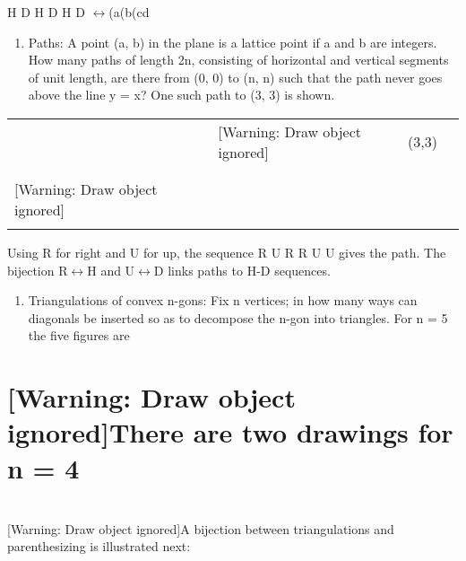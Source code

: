 \documentclass{article}
\begin{document}
H D H D H D $\leftrightarrow $(a(b(cd

\begin{enumerate}
\item [Warning: Draw object ignored]Paths:  A point (a, b) in the plane is a lattice point if a and b are integers. How
many paths of length 2n, consisting of horizontal and vertical segments of unit length, are there from (0, 0) to (n, n)
such that the path never goes above the line y = x? One such path to (3, 3) is shown.
\end{enumerate}
\begin{flushleft}
\tablefirsthead{}
\tablehead{}
\tabletail{}
\tablelasttail{}
\begin{supertabular}{|m{0.37055984in}|m{0.35875985in}|m{0.35875985in}|m{0.35875985in}m{0.35875985in}}
 &
 &
[Warning: Draw object ignored] &
(3,3) &
\\\hhline{----~}
 &
 &
 &
 &
\\\hhline{----~}
 &
 &
 &
 &
\\\hhline{----~}
[Warning: Draw object ignored] &
 &
 &
 &
\\\hhline{----~}
\end{supertabular}
\end{flushleft}
Using R for right and U for up, the sequence R U R R U U gives the path. The bijection R$\leftrightarrow $H and
U$\leftrightarrow $D links paths to H-D sequences.

\begin{enumerate}
\item [Warning: Draw object ignored]Triangulations of convex n{}-gons: Fix n vertices; in how many ways can diagonals be
inserted so as to decompose the n{}-gon into triangles. For n = 5  the five figures are
\end{enumerate}
\section[There are two drawings for n = 4]{[Warning: Draw object ignored]There are two drawings for n = 4}
\section{}
[Warning: Draw object ignored]A bijection between triangulations and parenthesizing is illustrated next:
\end{document}
